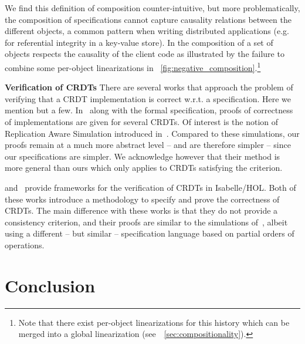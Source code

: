 \begin{inparaenum}
  We find this definition of composition counter-intuitive, but more
  problematically, the composition of specifications cannot capture
  causality relations between the different objects, a common
  pattern when writing distributed applications (e.g. for referential
  integrity in a key-value store).
  In \CRDTLinshort{} the composition of a set of objects respects the
  causality of the client code as illustrated by the failure to combine
  some per-object linearizations in
  \figureautorefname~\ref{fig:negative_composition}.\footnote{Note that
    there exist per-object linearizations for this history which can be
    merged into a global linearization
    (see~\sectionautorefname~\ref{sec:compositionality}).}
\end{inparaenum}

\smallskip
\noindent
{\bf Verification of CRDTs}
There are several works that approach the problem of verifying that a
CRDT implementation is correct w.r.t. a specification.
%
Here we mention but a few.
%
In~\cite{BurckhardtGYZ14, AttiyaBGMYZ16, Burckhardt14} along with the
formal specification, proofs of correctness of implementations are
given for several CRDTs.
%
Of interest is the notion of Replication Aware Simulation introduced
in~\cite{BurckhardtGYZ14}.
%
Compared to these simulations, our proofs remain at a much more
abstract level -- and are therefore simpler -- since our
specifications are simpler.
%
We acknowledge however that their method is more general than ours
which only applies to CRDTs satisfying the \CRDTLinshort{} criterion.

\citet{ZellerBP14} and~\citet{GomesKMB17} provide frameworks for the
verification of CRDTs in Isabelle/HOL\@.
%
Both of these works introduce a methodology to specify and prove the
correctness of CRDTs.
%
The main difference with these works is that they do not provide a
consistency criterion, and their proofs are similar to the simulations
of~\cite{BurckhardtGYZ14}, albeit using a different -- but similar
-- specification language based on partial orders of operations.

\section{Conclusion}
\label{sec:conclusion}

